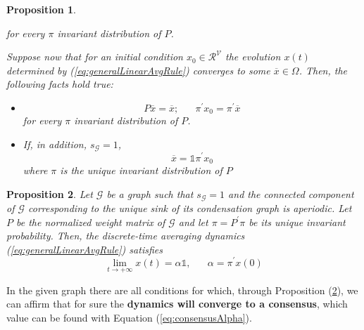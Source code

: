 \documentclass[
	12pt, %
]{fphw}
\newtheorem{proposition}{Proposition}
\begin{document}
\begin{enumerate}[(a\normalfont)]
\begin{proposition}
\begin{itemize}
\begin{equation}
        \end{equation}
        for every $\pi$ invariant distribution of $P$.
    \end{itemize}
    Suppose now that for an initial condition $x_0 \in \mathcal{R}^{\mathcal{V}}$ the evolution $x(t)$ determined by (\ref{eq:generalLinearAvgRule}) converges to some $\overline{x} \in \Omega$. Then, the following facts hold true:
    \begin{itemize}
        \item[(iii)] 
        \begin{equation}
            P\overline{x} = \overline{x}; \hspace{20pt} \pi^{'}x_0 = \pi^{'}\overline{x}
        \end{equation}
        for every $\pi$ invariant distribution of $P$.
        \item[(iv)] If, in addition, $s_\mathcal{G} = 1$,
        \begin{equation}\label{eq:xBarEqPiPrimeXZero}
            \overline{x} = \mathds{1}\pi^{'}x_0
        \end{equation}
        where $\pi$ is the unique invariant distribution of $P$
    \end{itemize}
    \end{proposition}
    \begin{proposition}\label{prop:propAlpha}
    Let $\mathcal{G}$ be a graph such that $s_{\mathcal{G}} = 1$ and the connected component of $\mathcal{G}$ corresponding to the unique sink of its condensation graph is aperiodic. Let $P$ be the normalized weight matrix of $\mathcal{G}$ and let $\pi = P^{'}\pi$ be its unique invariant probability. Then, the discrete-time averaging dynamics (\ref{eq:generalLinearAvgRule}) satisfies
    \begin{equation}\label{eq:consensusAlpha}
        \lim_{t \to +\infty}x(t) = \alpha\mathds{1}, \hspace{20pt} \alpha = \pi^{'}x(0)
    \end{equation}
    \end{proposition}
    
    In the given graph there are all conditions for which, through Proposition (\ref{prop:propAlpha}), we can affirm that for sure the \textbf{dynamics will converge to a consensus}, which value can be found with Equation (\ref{eq:consensusAlpha}). 
    

\end{enumerate}
\end{document}

